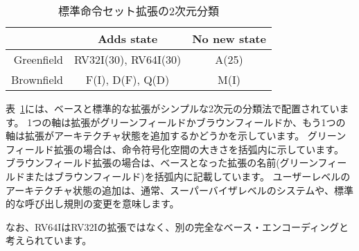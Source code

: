 \begin{table}[H]
{
\begin{center}
\begin{tabular}{|r|c|c|}
\hline
 & Adds state & No new state \\ \hline
Greenfield & RV32I(30), RV64I(30) & A(25) \\\hline
Brownfield & F(I), D(F), Q(D) & M(I) \\
\hline
\end{tabular}
\end{center}
}
\begin{comment}
\caption{Two-dimensional characterization of standard instruction-set
  extensions.}
\end{comment}
\caption{標準命令セット拡張の2次元分類}
\label{exttax}
\end{table}

\begin{comment}
Table~\ref{exttax} shows the bases and standard extensions placed in a
simple two-dimensional taxonomy.  One axis is whether the extension is
greenfield or brownfield, while the other axis is whether the
extension adds architectural state.  For greenfield extensions, the
size of the instruction encoding space is given in parentheses.  For
brownfield extensions, the name of the extension (greenfield or
brownfield) it builds upon is given in parentheses.  Additional
user-level architectural state usually implies changes to the
supervisor-level system or possibly to the standard calling
convention.
\end{comment}
表~\ref{exttax}には、ベースと標準的な拡張がシンプルな2次元の分類法で配置されています。
1つの軸は拡張がグリーンフィールドかブラウンフィールドか、もう1つの軸は拡張がアーキテクチャ状態を追加するかどうかを示しています。
グリーンフィールド拡張の場合は、命令符号化空間の大きさを括弧内に示しています。
ブラウンフィールド拡張の場合は、ベースとなった拡張の名前(グリーンフィールドまたはブラウンフィールド)を括弧内に記載しています。
ユーザーレベルのアーキテクチャ状態の追加は、通常、スーパーバイザレベルのシステムや、標準的な呼び出し規則の変更を意味します。

\begin{comment}
Note that RV64I is not considered an extension of RV32I, but a
different complete base encoding.
\end{comment}
なお、RV64IはRV32Iの拡張ではなく、別の完全なベース・エンコーディングと考えられています。

\vspace{-0.2in}
\begin{comment}
\subsection*{Standard-Compatible Global Encodings}
\end{comment}
